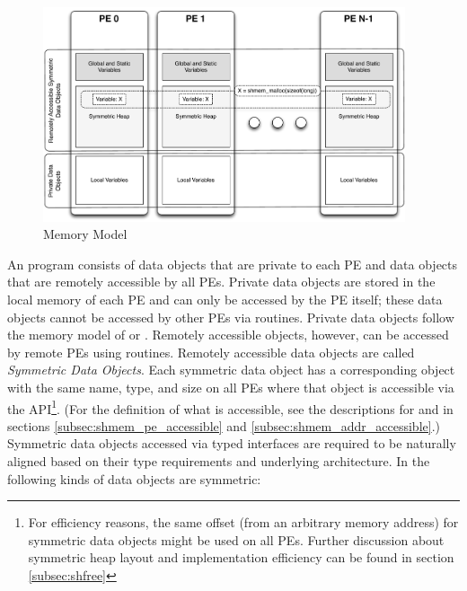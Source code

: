 \begin{figure}[h]
\includegraphics[width=0.95\textwidth]{figures/mem_model}      
\caption{\openshmem Memory Model}
\label{fig:mem_model}                                               
\end{figure}      
%
An \openshmem program consists of data objects that are private to each \ac{PE}
and data  objects that are remotely accessible by all \acp{PE}. Private data
objects are stored in the local memory of each \ac{PE} and can only be accessed
by the \ac{PE} itself; these data objects cannot be accessed by other \acp{PE}
via \openshmem routines. Private data objects follow the memory model of
\Cstd or \Fortran. Remotely accessible objects, however, can be accessed by
remote \acp{PE} using \openshmem routines.  Remotely accessible data objects are
called \emph{Symmetric Data Objects}.  Each symmetric data object has a
corresponding object with the same name, type, and size on all \acp{PE} where that object is
accessible via the \openshmem \ac{API}\footnote{For efficiency reasons,
the same offset (from an arbitrary memory address) for symmetric data
objects might be used on all \acp{PE}. Further discussion about symmetric heap
layout and implementation efficiency can be found in section
\ref{subsec:shfree}}.  (For the definition of what is accessible, see the
descriptions for  and 
in sections \ref{subsec:shmem_pe_accessible} and
\ref{subsec:shmem_addr_accessible}.) Symmetric data objects accessed via typed
\openshmem interfaces are required to be naturally aligned based on their type
requirements and underlying architecture.  In \openshmem the following kinds of
data objects are symmetric:
%
